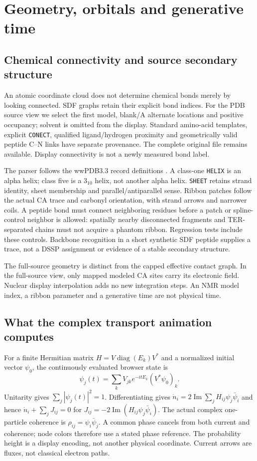 \documentclass[11pt,oneside,openany]{book}
\theoremstyle{definition}\newtheorem{definition}[theorem]{Definition}
\theoremstyle{remark}\newtheorem{remark}[theorem]{Remark}
\begin{document}
\section{Geometry, orbitals and generative time}
\subsection{Chemical connectivity and source secondary structure}
An atomic coordinate cloud does not determine chemical bonds merely by
looking connected. SDF graphs retain their explicit bond indices. For the PDB
source view we select the first model, blank/A alternate locations and positive
occupancy; solvent is omitted from the display. Standard amino-acid templates,
explicit \texttt{CONECT}, qualified ligand/hydrogen proximity and geometrically
valid peptide C--N links have separate provenance. The complete original file
remains available. Display connectivity is not a newly measured bond label.

The parser follows the wwPDB3.3 record definitions \cite{VisPDB}. A class-one
\texttt{HELIX} is an alpha helix; class five is a $3_{10}$ helix, not another
alpha helix. \texttt{SHEET} retains strand identity, sheet membership and
parallel/antiparallel sense. Ribbon patches follow the actual CA trace and
carbonyl orientation, with strand arrows and narrower coils. A peptide bond
must connect neighboring residues before a patch or spline-control neighbor
is allowed: spatially nearby disconnected fragments and TER-separated chains
must not acquire a phantom ribbon. Regression tests include these controls.
Backbone recognition in a short synthetic SDF peptide supplies a trace, not a
DSSP assignment or evidence of a stable secondary structure.

The full-source geometry is distinct from the capped effective contact graph.
In the full-source view, only mapped modeled CA sites carry its electronic
field. Nuclear display interpolation adds no new integration steps. An NMR
model index, a ribbon parameter and a generative time are not physical time.

\subsection{What the complex transport animation computes}
For a finite Hermitian matrix $H=V\operatorname{diag}(E_k)V^*$ and a normalized
initial vector $\psi_0$, the continuously evaluated browser state is
\[
 \psi_j(t)=\sum_k V_{jk}e^{-itE_k}(V^*\psi_0)_k.
\]
Unitarity gives $\sum_j|\psi_j(t)|^2=1$. Differentiating gives
$\dot n_i=2\operatorname{Im}\sum_jH_{ij}\psi_j\bar\psi_i$ and hence
$\dot n_i+\sum_jJ_{ij}=0$ for
$J_{ij}=-2\operatorname{Im}(H_{ij}\psi_j\bar\psi_i)$.
The actual complex one-particle coherence is
$\rho_{ij}=\psi_i\bar\psi_j$. A common phase cancels from both current and
coherence; node colors therefore use a stated phase reference. The probability
height is a display encoding, not another physical coordinate. Current arrows
are fluxes, not classical electron paths.
\end{document}
